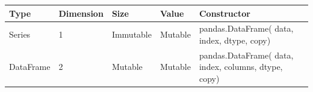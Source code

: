 \documentclass[
]{book}
\begin{document}
\begin{longtable}[]{@{}lllll@{}}
\toprule
\begin{minipage}[b]{0.10\columnwidth}\raggedright
Type\strut
\end{minipage} & \begin{minipage}[b]{0.10\columnwidth}\raggedright
Dimension\strut
\end{minipage} & \begin{minipage}[b]{0.10\columnwidth}\raggedright
Size\strut
\end{minipage} & \begin{minipage}[b]{0.08\columnwidth}\raggedright
Value\strut
\end{minipage} & \begin{minipage}[b]{0.48\columnwidth}\raggedright
Constructor\strut
\end{minipage}\tabularnewline
\midrule
\endhead
\begin{minipage}[t]{0.10\columnwidth}\raggedright
Series\strut
\end{minipage} & \begin{minipage}[t]{0.10\columnwidth}\raggedright
1\strut
\end{minipage} & \begin{minipage}[t]{0.10\columnwidth}\raggedright
Immutable\strut
\end{minipage} & \begin{minipage}[t]{0.08\columnwidth}\raggedright
Mutable\strut
\end{minipage} & \begin{minipage}[t]{0.48\columnwidth}\raggedright
pandas.DataFrame( data, index, dtype, copy)\strut
\end{minipage}\tabularnewline
\begin{minipage}[t]{0.10\columnwidth}\raggedright
DataFrame\strut
\end{minipage} & \begin{minipage}[t]{0.10\columnwidth}\raggedright
2\strut
\end{minipage} & \begin{minipage}[t]{0.10\columnwidth}\raggedright
Mutable\strut
\end{minipage} & \begin{minipage}[t]{0.08\columnwidth}\raggedright
Mutable\strut
\end{minipage} & \begin{minipage}[t]{0.48\columnwidth}\raggedright
pandas.DataFrame( data, index, columns, dtype, copy)\strut
\end{minipage}\tabularnewline

\end{longtable}
\end{document}
